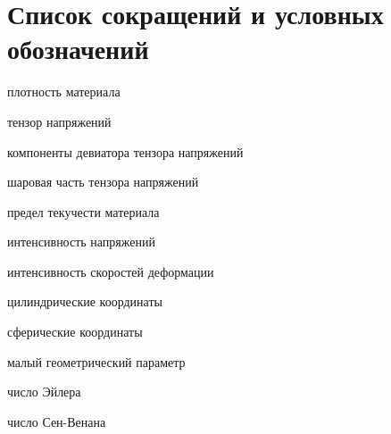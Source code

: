 \chapter*{Список сокращений и условных обозначений} %
\begin{description}[align=right,leftmargin=3.5cm]
\item[\(\varrho\)] плотность материала
\item[\(\sigma_{ij}\)] тензор напряжений
\item[\(s_{ij}\)] компоненты девиатора тензора напряжений
\item[\(p\)] шаровая часть тензора напряжений
\item[\(\sigma_{s}\)] предел текучести материала
\item[\(\sigma_{u}\)] интенсивность напряжений
\item[\(v_{u}\)] интенсивность скоростей деформации
\item[\(r, z, \theta\)] цилиндрические координаты
\item[\(r, \theta, \phi\)] сферические координаты
\item[\(\alpha\)] малый геометрический параметр
\item[Eu] число Эйлера
\item[S] число Сен-Венана
\end{description}
